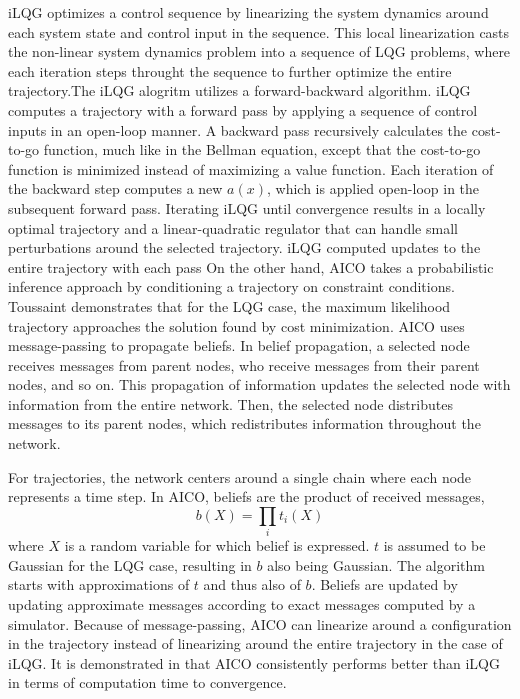 \documentclass[12pt]{article}
\begin{document}
            iLQG optimizes a control sequence by linearizing the system dynamics around each system state and control input in the sequence. This local linearization casts the non-linear system dynamics problem into a sequence of LQG problems, where each iteration steps throught the sequence to further optimize the entire trajectory.The iLQG alogritm utilizes a forward-backward algorithm. iLQG computes a trajectory with a forward pass by applying a sequence of control inputs in an open-loop manner. A backward pass recursively calculates the cost-to-go function, much like in the Bellman equation, except that the cost-to-go function is minimized instead of maximizing a value function. Each iteration of the backward step computes a new $a(x)$, which is applied open-loop in the subsequent forward pass. Iterating iLQG until convergence results in a locally optimal trajectory and a linear-quadratic regulator that can handle small perturbations around the selected trajectory.\cite{todorov_generalized_2005} iLQG computed updates to the entire trajectory with each pass
            On the other hand, AICO takes a probabilistic inference approach by conditioning a trajectory on constraint conditions. Toussaint demonstrates that for the LQG case, the maximum likelihood trajectory approaches the solution found by cost minimization. AICO uses message-passing to propagate beliefs. In belief propagation, a selected node receives messages from parent nodes, who receive messages from their parent nodes, and so on. This propagation of information updates the selected node with information from the entire network. Then, the selected node distributes messages to its parent nodes, which redistributes information throughout the network. 
            \par For trajectories, the network centers around a single chain where each node represents a time step. In AICO, beliefs are the product of received messages,
            \begin{equation}
                b(X)=\prod_{i}t_{i}(X)
            \end{equation}
            where $X$ is a random variable for which belief is expressed. $t$ is assumed to be Gaussian for the LQG case, resulting in $b$ also being Gaussian. The algorithm starts with approximations of $t$ and thus also of $b$. Beliefs are updated by updating approximate messages according to exact messages computed by a simulator.
            Because of message-passing, AICO can linearize around a configuration in the trajectory instead of linearizing around the entire trajectory in the case of iLQG.\cite{toussaint_robot_2009} It is demonstrated in \cite{toussaint_robot_2009} that AICO consistently performs better than iLQG in terms of computation time to convergence.
\end{document}

